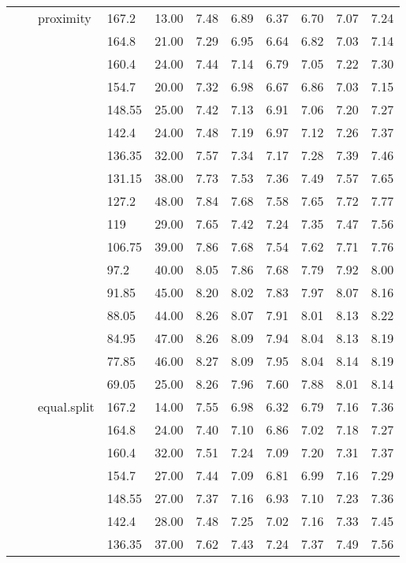 \begin{longtable}{llllrrrrrrr}
   &  & proximity & 167.2 & 13.00 & 7.48 & 6.89 & 6.37 & 6.70 & 7.07 & 7.24 \\ 
   &  &  & 164.8 & 21.00 & 7.29 & 6.95 & 6.64 & 6.82 & 7.03 & 7.14 \\ 
   &  &  & 160.4 & 24.00 & 7.44 & 7.14 & 6.79 & 7.05 & 7.22 & 7.30 \\ 
   &  &  & 154.7 & 20.00 & 7.32 & 6.98 & 6.67 & 6.86 & 7.03 & 7.15 \\ 
   &  &  & 148.55 & 25.00 & 7.42 & 7.13 & 6.91 & 7.06 & 7.20 & 7.27 \\ 
   &  &  & 142.4 & 24.00 & 7.48 & 7.19 & 6.97 & 7.12 & 7.26 & 7.37 \\ 
   &  &  & 136.35 & 32.00 & 7.57 & 7.34 & 7.17 & 7.28 & 7.39 & 7.46 \\ 
   &  &  & 131.15 & 38.00 & 7.73 & 7.53 & 7.36 & 7.49 & 7.57 & 7.65 \\ 
   &  &  & 127.2 & 48.00 & 7.84 & 7.68 & 7.58 & 7.65 & 7.72 & 7.77 \\ 
   &  &  & 119 & 29.00 & 7.65 & 7.42 & 7.24 & 7.35 & 7.47 & 7.56 \\ 
   &  &  & 106.75 & 39.00 & 7.86 & 7.68 & 7.54 & 7.62 & 7.71 & 7.76 \\ 
   &  &  & 97.2 & 40.00 & 8.05 & 7.86 & 7.68 & 7.79 & 7.92 & 8.00 \\ 
   &  &  & 91.85 & 45.00 & 8.20 & 8.02 & 7.83 & 7.97 & 8.07 & 8.16 \\ 
   &  &  & 88.05 & 44.00 & 8.26 & 8.07 & 7.91 & 8.01 & 8.13 & 8.22 \\ 
   &  &  & 84.95 & 47.00 & 8.26 & 8.09 & 7.94 & 8.04 & 8.13 & 8.19 \\ 
   &  &  & 77.85 & 46.00 & 8.27 & 8.09 & 7.95 & 8.04 & 8.14 & 8.19 \\ 
   &  &  & 69.05 & 25.00 & 8.26 & 7.96 & 7.60 & 7.88 & 8.01 & 8.14 \\ 
   &  & equal.split & 167.2 & 14.00 & 7.55 & 6.98 & 6.32 & 6.79 & 7.16 & 7.36 \\ 
   &  &  & 164.8 & 24.00 & 7.40 & 7.10 & 6.86 & 7.02 & 7.18 & 7.27 \\ 
   &  &  & 160.4 & 32.00 & 7.51 & 7.24 & 7.09 & 7.20 & 7.31 & 7.37 \\ 
   &  &  & 154.7 & 27.00 & 7.44 & 7.09 & 6.81 & 6.99 & 7.16 & 7.29 \\ 
   &  &  & 148.55 & 27.00 & 7.37 & 7.16 & 6.93 & 7.10 & 7.23 & 7.36 \\ 
   &  &  & 142.4 & 28.00 & 7.48 & 7.25 & 7.02 & 7.16 & 7.33 & 7.45 \\ 
   &  &  & 136.35 & 37.00 & 7.62 & 7.43 & 7.24 & 7.37 & 7.49 & 7.56 \\ 

\end{longtable}
